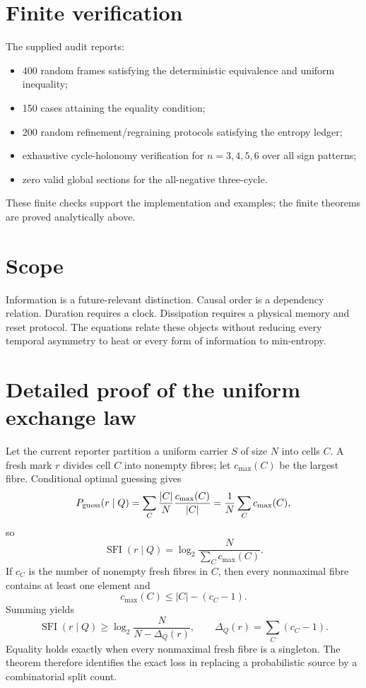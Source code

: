 \documentclass[11pt,a4paper]{article}
\begin{document}
\section{Finite verification}
The supplied audit reports:
\begin{itemize}
\item 400 random frames satisfying the deterministic equivalence and uniform inequality;
\item 150 cases attaining the equality condition;
\item 200 random refinement/regraining protocols satisfying the entropy ledger;
\item exhaustive cycle-holonomy verification for $n=3,4,5,6$ over all sign patterns;
\item zero valid global sections for the all-negative three-cycle.
\end{itemize}
These finite checks support the implementation and examples; the finite theorems are proved analytically above.

\section{Scope}
Information is a future-relevant distinction. Causal order is a dependency relation. Duration requires a clock. Dissipation requires a physical memory and reset protocol. The equations relate these objects without reducing every temporal asymmetry to heat or every form of information to min-entropy.


\section{Detailed proof of the uniform exchange law}
Let the current reporter partition a uniform carrier $S$ of size $N$ into cells $C$. A fresh mark $r$ divides cell $C$ into nonempty fibres; let $c_{\max}(C)$ be the largest fibre. Conditional optimal guessing gives
\begin{equation}
P_{\rm guess}(r\mid Q)=\sum_C\frac{|C|}{N}\frac{c_{\max}(C)}{|C|}
=\frac1N\sum_Cc_{\max}(C),
\end{equation}
so
\begin{equation}
\operatorname{SFI}(r\mid Q)=\log_2\frac{N}{\sum_Cc_{\max}(C)}.
\end{equation}
If $c_C$ is the number of nonempty fresh fibres in $C$, then every nonmaximal fibre contains at least one element and
\begin{equation}
c_{\max}(C)\le |C|-(c_C-1).
\end{equation}
Summing yields
\begin{equation}
\operatorname{SFI}(r\mid Q)\ge
\log_2\frac{N}{N-\Delta_Q(r)},
\qquad \Delta_Q(r)=\sum_C(c_C-1).
\end{equation}
Equality holds exactly when every nonmaximal fresh fibre is a singleton. The theorem therefore identifies the exact loss in replacing a probabilistic source by a combinatorial split count.
\end{document}
